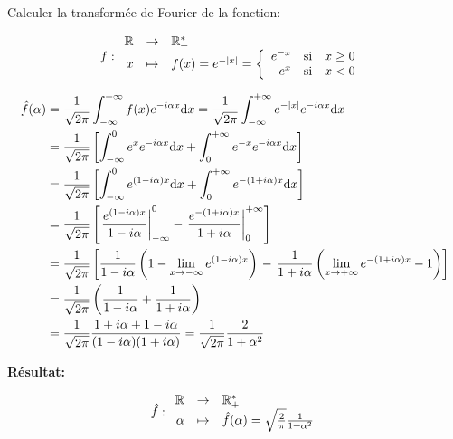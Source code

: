 \begin{example}
    Calculer la transformée de Fourier de la fonction:
    
    \[
    f:
    \begin{array}{r c l}
        \mathbb{R} & \rightarrow & \mathbb{R}_+^* \\
        x  & \mapsto & f(x) = e^{-|x|} =
        \left \{
        \begin{array}{r c l}
            e^{-x} & \textrm{si} & x \geq 0 \\
            e^x    & \textrm{si} & x < 0
        \end{array}
        \right.
    \end{array}
    \]
    
    \begin{align*}
    \hat{f}(\alpha) & =
    \frac{1}{\sqrt{2 \pi}}
    \int_{-\infty}^{+\infty}
    f(x)
    e^{-i \alpha x}
    \mathrm{d}x
    =
    \frac{1}{\sqrt{2 \pi}}
    \int_{-\infty}^{+\infty}
    e^{-|x|}
    e^{-i \alpha x}
    \mathrm{d}x
    \\&=
    \frac{1}{\sqrt{2 \pi}}
    \left[
    \int_{-\infty}^{0}
    e^{x}
    e^{-i \alpha x}
    \mathrm{d}x
    +
    \int_{0}^{+\infty}
    e^{-x}
    e^{-i \alpha x}
    \mathrm{d}x
    \right]
    \\&=
    \frac{1}{\sqrt{2 \pi}}
    \left[
    \int_{-\infty}^{0}
    e^{(1 - i \alpha) x}
    \mathrm{d}x
    +
    \int_{0}^{+\infty}
    e^{-(1 + i \alpha) x}
    \mathrm{d}x
    \right]
    \\&=
    \frac{1}{\sqrt{2 \pi}}
    \left[
    \left.
    \frac{e^{(1 - i \alpha) x}}
    {1 - i \alpha}
    \right|_{-\infty}^0
    -
    \left.
    \frac{e^{-(1 + i \alpha) x}}
    {1 + i \alpha}
    \right|_0^{+\infty}
    \right]
    \\&=
    \frac{1}{\sqrt{2 \pi}}
    \left[
    \frac{1}
    {1 - i \alpha}
    \left(
    1 - \lim\limits_{x \rightarrow -\infty} e^{(1 - i \alpha) x}
    \right)
    \right.
    -
    \left.
    \frac{1}
    {1 + i \alpha}
    \left(
    \lim\limits_{x \rightarrow + \infty} e^{-(1 + i \alpha) x} - 1
    \right)
    \right]
    \\&=
    \frac{1}{\sqrt{2 \pi}}
    \left(
    \frac{1}{1 - i \alpha}
    +
    \frac{1}{1 + i \alpha}
    \right)
    \\&=
    \frac{1}{\sqrt{2 \pi}}
    \frac{1 + i \alpha + 1 - i \alpha}
    {(1 - i \alpha) (1 + i \alpha)}
    =
    \frac{1}{\sqrt{2 \pi}}
    \frac{2}{1 + \alpha^2}
    \end{align*}
    
    \textbf{Résultat:}
    
    \[
    \hat{f}:
    \begin{array}{r c l}
    \mathbb{R} & \rightarrow & \mathbb{R}_+^* \\
    \alpha & \mapsto & \hat{f}(\alpha) =
    \sqrt{\frac{2}{\pi}} \frac{1}{1 + \alpha^2}
    \end{array}
    \]
\end{example}

